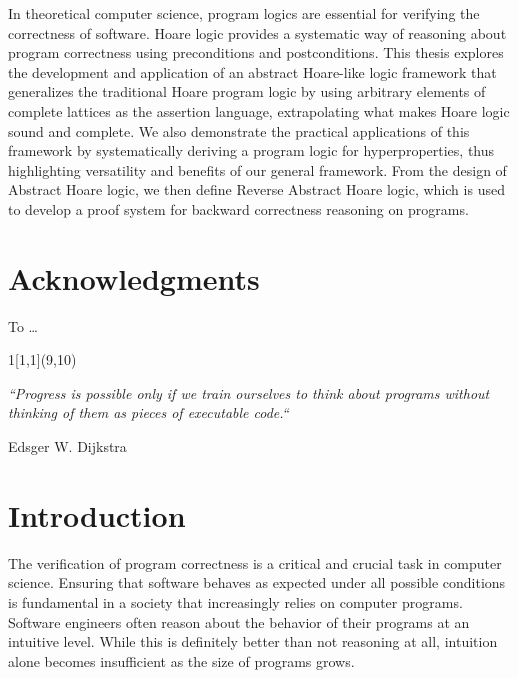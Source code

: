 \documentclass[
  10pt,       %
  twoside,    %
  a4paper,    %
  english,    %
  tikz,       %
  openright,  %
]{book}
\begin{document}
In theoretical computer science, program logics are essential for verifying the
correctness of software. Hoare logic provides a systematic way of reasoning
about program correctness using preconditions and postconditions. This thesis
explores the development and application of an abstract Hoare-like logic framework
that generalizes the traditional Hoare program logic by using arbitrary elements of
complete lattices as the assertion language, extrapolating what makes Hoare
logic sound and complete. We also demonstrate the practical applications of
this framework by systematically deriving a program logic for hyperproperties, thus highlighting
versatility and benefits of our general framework. From the design of Abstract Hoare logic, we
then define Reverse Abstract Hoare logic, which is used to develop a proof system for
backward correctness reasoning on programs.

\vfill
\cleardoublepage
{}
{}

\begingroup

\chapter*{Acknowledgments}

To \dots

\begin{textblock}{1}[1,1](9,10)
  \epigraph{\textit{``Progress is possible only if we train ourselves to think 
  about programs without thinking of them as pieces of executable code.``}}
  {Edsger W. Dijkstra}
\end{textblock}


\endgroup
\cleardoublepage

\cleardoublepage

\begingroup
\hypersetup{linkcolor=black}
\tableofcontents
\endgroup

\cleardoublepage
\mainmatter

\chapter*{Introduction}

The verification of program correctness is a critical and crucial task in
computer science. Ensuring that software behaves as expected under all possible
conditions is fundamental in a society that increasingly relies on computer
programs. Software engineers often reason about the behavior of their programs
at an intuitive level. While this is definitely better than not reasoning at
all, intuition alone becomes insufficient as the size of programs grows.
\end{document}
